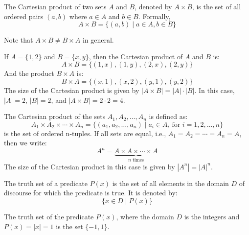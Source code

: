 \begin{definition}
    The Cartesian product of two sets $A$ and $B$, denoted by $A \times B$, is the set of all ordered pairs $(a, b)$ where $a \in A$ and $b \in B$. Formally,
    \[ A \times B = \{(a, b) \mid a \in A, b \in B\} \]
\end{definition}
Note that $A \times B \neq B \times A$ in general.
\begin{eg}
    If $A = \{1, 2\}$ and $B = \{x, y\}$, then the Cartesian product of $A$ and $B$ is:
    \[ A \times B = \{(1, x), (1, y), (2, x), (2, y)\} \]
    And the product $B \times A$ is:
    \[ B \times A = \{(x, 1), (x, 2), (y, 1), (y, 2)\} \]
    The size of the Cartesian product is given by $|A \times B| = |A| \cdot |B|$. In this case, $|A| = 2$, $|B| = 2$, and $|A \times B| = 2 \cdot 2 = 4$.
\end{eg}
\begin{eg}
    The Cartesian product of the sets $A_1, A_2, \ldots, A_n$ is defined as:
    \[ A_1 \times A_2 \times \cdots \times A_n = \{(a_1, a_2, \ldots, a_n) \mid a_i \in A_i \text{ for } i = 1, 2, \ldots, n\} \]
    is the set of ordered n-tuples. If all sets are equal, i.e., $A_1 = A_2 = \cdots = A_n = A$, then we write:
    \[ A^n = \underbrace{A \times A \times \cdots \times A}_{n \text{ times}} \]
    The size of the Cartesian product in this case is given by $|A^n| = |A|^n$.
\end{eg}

\begin{definition}
    The truth set of a predicate $P(x)$ is the set of all elements in the domain $D$ of discourse for which the predicate is true. It is denoted by:
    \[ \{x \in D \mid P(x)\} \]
\end{definition}
\begin{eg}
    The truth set of the predicate $P(x)$, where the domain $D$ is the integers and $P(x) = |x| = 1$ is the set $\{-1, 1\}$.
\end{eg}

